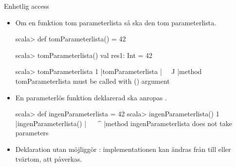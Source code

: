 \begin{Slide}{Enhetlig access}\SlideFontSmall
\begin{itemize}
\item Om en funktion   tom parameterlista \code{()} så ska den   tom parameterlista.
\begin{REPLsmall}
scala> def tomParameterlista() = 42

scala> tomParameterlista()
val res1: Int = 42

scala> tomParameterlista                                                                                                                    
1 |tomParameterlista
  |^^^^^^^^^^^^^^^^^
  |method tomParameterlista must be called with () argument
\end{REPLsmall}

\item En parameterlös funktion deklarerad  \code{()} ska anropas  \code{()}. 
\begin{REPLsmall}
scala> def ingenParameterlista = 42
scala> ingenParameterlista()
1 |ingenParameterlista()
  |^^^^^^^^^^^^^^^^^^^
  |method ingenParameterlista does not take parameters
\end{REPLsmall}

\item Deklaration utan \code{()} möjliggör : implementationen kan ändras från  till  eller tvärtom,  att  påverkas.
\pause

\end{itemize}
\end{Slide}


